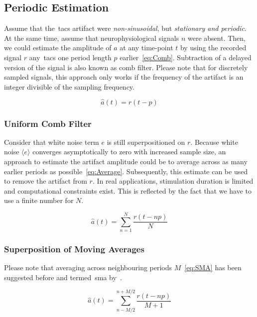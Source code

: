 \documentclass[a4paper]{article}
\begin{document}
\subsection{Periodic Estimation}
Assume that the~\gls{tacs} artifact were \emph{non-sinusoidal}, but \emph{stationary and periodic}. At the same time, assume that neurophysiological signals $n$ were absent. Then, we could estimate the amplitude of $a$ at any time-point $t$ by using the recorded signal $r$ any~\gls{tacs} one period length $p$ earlier~\eqref{eq:Comb}.
Subtraction of a delayed version of the signal is also known as comb filter. Please note that for discretely sampled signals, this approach only works if the frequency of the artifact is an integer divisible of the sampling frequency.

\begin{equation}
    \hat{a}(t) = r(t-p)\label{eq:Comb}
\end{equation}

\subsubsection{Uniform Comb Filter}

Consider that white noise term $e$ is still superpositioned on $r$.  Because white noise $\langle e\rangle$ converges asymptotically to zero with increased sample size, an approach to estimate the artifact amplitude could be to average across as many earlier periods as possible~\eqref{eq:Average}. Subsequently, this estimate can be used to  remove the artifact from $r$.
In real applications, stimulation duration is limited and computational constraints exist. This is reflected by the fact that we have to use a finite number for $N$.

\begin{equation}
    \hat{a}(t) = \sum_{n=1}^{N} \frac{r(t - np)}{N}\label{eq:Average}
\end{equation}

\subsubsection{Superposition of Moving Averages}

Please note that averaging across neighbouring periods $M$~\eqref{eq:SMA} has been suggested before and termed~\gls{sma} by~\cite{Kohli_2015}.

\begin{equation}
    \hat{a}(t) = \sum_{n-M/2}^{n+M/2} \frac{r(t - np)}{M+1}\label{eq:SMA}
\end{equation}
\end{document}
